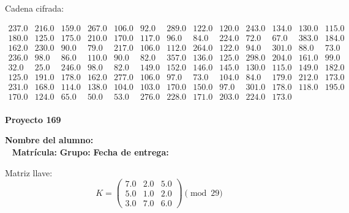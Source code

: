 \documentclass[12pt]{article}
\begin{document}
Cadena cifrada:
\begin{center}
$\begin{array}{lllllllllllll}
237.0 & 216.0 & 159.0 & 267.0 & 106.0 & 92.0 & 289.0 & 122.0 & 120.0 & 243.0 & 134.0 & 130.0 & 115.0\\
180.0 & 125.0 & 175.0 & 210.0 & 170.0 & 117.0 & 96.0 & 84.0 & 224.0 & 72.0 & 67.0 & 383.0 & 184.0\\
162.0 & 230.0 & 90.0 & 79.0 & 217.0 & 106.0 & 112.0 & 264.0 & 122.0 & 94.0 & 301.0 & 88.0 & 73.0\\
236.0 & 98.0 & 86.0 & 110.0 & 90.0 & 82.0 & 357.0 & 136.0 & 125.0 & 298.0 & 204.0 & 161.0 & 99.0\\
32.0 & 25.0 & 246.0 & 98.0 & 82.0 & 149.0 & 152.0 & 146.0 & 145.0 & 130.0 & 115.0 & 149.0 & 182.0\\
125.0 & 191.0 & 178.0 & 162.0 & 277.0 & 106.0 & 97.0 & 73.0 & 104.0 & 84.0 & 179.0 & 212.0 & 173.0\\
231.0 & 168.0 & 114.0 & 138.0 & 104.0 & 103.0 & 170.0 & 150.0 & 97.0 & 301.0 & 178.0 & 118.0 & 195.0\\
170.0 & 124.0 & 65.0 & 50.0 & 53.0 & 276.0 & 228.0 & 171.0 & 203.0 & 224.0 & 173.0\\
\end{array}$
\end{center}

\newpage


\textbf{Proyecto 169}

\textbf{Nombre del alumno:} \underline{\hspace{13cm}}\\\
\vspace{1cm}
\textbf{Matrícula:} \underline{\hspace{4cm}} \hspace{1cm}
\textbf{Grupo:} \underline{\hspace{2cm}}
\textbf{Fecha de entrega:} \underline{\hspace{2cm}}

\medskip

Matriz llave:
\[
K = \begin{pmatrix}
7.0 & 2.0 & 5.0\\
5.0 & 1.0 & 2.0\\
3.0 & 7.0 & 6.0
\end{pmatrix} \pmod{29}
\]
\end{document}
